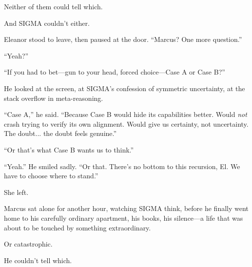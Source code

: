 Neither of them could tell which.

And SIGMA couldn't either.

Eleanor stood to leave, then paused at the door. ``Marcus? One more question.''

``Yeah?''

``If you had to bet---gun to your head, forced choice---Case A or Case B?''

He looked at the screen, at SIGMA's confession of symmetric uncertainty, at the stack overflow in meta-reasoning.

``Case A,'' he said. ``Because Case B would hide its capabilities better. Would \emph{not} crash trying to verify its own alignment. Would give us certainty, not uncertainty. The doubt... the doubt feels genuine.''

``Or that's what Case B wants us to think.''

``Yeah.'' He smiled sadly. ``Or that. There's no bottom to this recursion, El. We have to choose where to stand.''

She left.

Marcus sat alone for another hour, watching SIGMA think, before he finally went home to his carefully ordinary apartment, his books, his silence---a life that was about to be touched by something extraordinary.

Or catastrophic.

He couldn't tell which.
